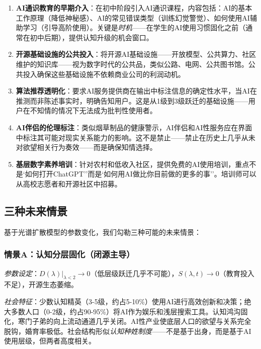 \documentclass[12pt,a4paper]{ctexart}
\begin{document}
\begin{enumerate}[label=(\arabic*)]
\item \textbf{AI通识教育的早期介入}：在初中阶段引入AI通识课程，内容包括：AI的基本工作原理（降低神秘感）、AI的常见错误类型（训练幻觉警觉）、如何使用AI辅助学习（引导高阶使用）。关键是\emph{时机}——在学生的AI使用习惯固化之前（通常在初中后期），提供认知升级的机会窗口。

\item \textbf{开源基础设施的公共投入}：将开源AI基础设施——开放模型、公共算力、社区维护的知识库——视为数字时代的公共品，类似公路、电网、公共图书馆。公共投入确保这些基础设施不依赖商业公司的利润动机。

\item \textbf{算法推荐透明化}：要求AI服务提供商在输出中标注信息的确定性水平，当AI在推测而非陈述事实时，明确告知用户。这是从1级到3级跃迁的基础设施——用户在不知情的情况下无法成为批判性使用者。

\item \textbf{AI伴侣的伦理标注}：类似烟草制品的健康警示，AI伴侣和AI性服务应在界面中标注其可能对现实关系能力的影响。这不是禁止——禁止在历史上几乎从未对欲望相关行为奏效——而是确保知情选择。

\item \textbf{基层数字素养培训}：针对农村和低收入社区，提供免费的AI使用培训，重点不是`如何打开ChatGPT''而是`如何用AI做比你目前做的更多的事''。培训师可以从高校志愿者和开源社区中招募。
\end{enumerate}

\subsection{三种未来情景}

基于光谱扩散模型的参数变化，我们勾勒三种可能的未来情景：

\subsubsection{情景A：认知分层固化（闭源主导）}

\textit{参数设定}：$D(\lambda)|_{\lambda<2} \to 0$（低层级跃迁几乎不可能），$S(\lambda, t) \to 0$（教育投入不足），开源生态萎缩。

\textit{社会特征}：少数认知精英（3-5级，约占5-10\%）使用AI进行高效创新和决策；绝大多数人口（0-2级，约占90-95\%）将AI作为娱乐和浅层搜索工具。认知鸿沟固化，寒门子弟的向上流动通道几乎关闭。AI性产业使底层人口的欲望与关系完全脱钩，婚育率极低。社会结构形似\textit{认知种姓制度}——不是基于出身，而是基于AI使用层级，但两者高度相关。
\end{document}
